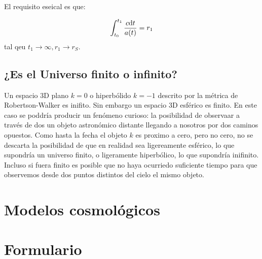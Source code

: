 El requisito eseical es que:

\begin{equation}
	\int_{t_0}^{t_1} \frac{c\mathrm{d} t}{a(t)} = r_1
\end{equation}
tal qeu $t_1\rightarrow \infty, r_1 \rightarrow r_{S}$.

\subsection{¿Es el Universo finito o infinito?}

Un espacio 3D plano $k=0$ o hiperbólido $k=-1$ descrito por la métrica de Robertson-Walker es inifito. Sin embargo un espacio 3D esférico es finito. En este caso se poddría producir un fenómeno curioso: la posibilidad de observaar a través de dos un objeto astronómico distante llegando a nosotros por dos caminos opuestos. Como hasta la fecha el objeto $k$ es proximo a cero, pero no cero, no se descarta la posibilidad de que en realidad sea ligereamente esférico, lo que supondría un universo finito, o ligeramente hiperbólico, lo que supondría inifinito. Incluso si fuera finito es posible que no haya ocurriedo suficiente tiempo para que observemos desde dos puntos distintos del cielo el mismo objeto.




\newpage 

\section{Modelos cosmológicos}


\newpage
\section*{Formulario}


